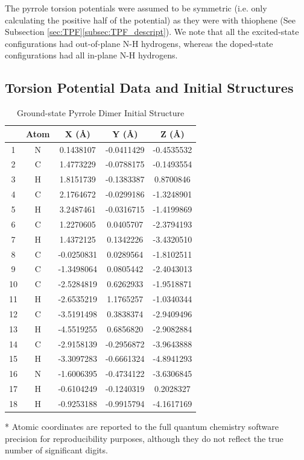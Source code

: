 The pyrrole torsion potentials were assumed to be symmetric (i.e. only calculating the positive half of the potential) as they were with thiophene (See Subsection \ref{sec:TPF}\ref{subsec:TPF_descript}). We note that all the excited-state configurations had out-of-plane N-H hydrogens, whereas the doped-state configurations had all in-plane N-H hydrogens.

\clearpage

\subsection{Torsion Potential Data and Initial Structures}
\begin{table}[hbt!]\centering
\caption{Ground-state Pyrrole Dimer Initial Structure}
\renewcommand{\arraystretch}{1.5}
\begin{threeparttable}
\begin{tabular}{ccccc}\toprule
{} & {Atom} & {X (\AA)} & {Y (\AA)} & {Z (\AA)} \\ \midrule
    1  & N &  0.1438107 & -0.0411429 & -0.4535532\\
    2  & C &  1.4773229 & -0.0788175 & -0.1493554\\
    3  & H &  1.8151739 & -0.1383387 &  0.8700846\\
    4  & C &  2.1764672 & -0.0299186 & -1.3248901\\
    5  & H &  3.2487461 & -0.0316715 & -1.4199869\\
    6  & C &  1.2270605 &  0.0405707 & -2.3794193\\
    7  & H &  1.4372125 &  0.1342226 & -3.4320510\\
    8  & C & -0.0250831 &  0.0289564 & -1.8102511\\
    9  & C & -1.3498064 &  0.0805442 & -2.4043013\\
    10 & C & -2.5284819 &  0.6262933 & -1.9518871\\
    11 & H & -2.6535219 &  1.1765257 & -1.0340344\\
    12 & C & -3.5191498 &  0.3838374 & -2.9409496\\
    13 & H & -4.5519255 &  0.6856820 & -2.9082884\\
    14 & C & -2.9158139 & -0.2956872 & -3.9643888\\
    15 & H & -3.3097283 & -0.6661324 & -4.8941293\\
    16 & N & -1.6006395 & -0.4734122 & -3.6306845\\
    17 & H & -0.6104249 & -0.1240319 &  0.2028327\\
    18 & H & -0.9253188 & -0.9915794 & -4.1617169\\ \bottomrule
\end{tabular}
\begin{tablenotes}
\item[*] \footnotesize Atomic coordinates are reported to the full quantum chemistry software precision for reproducibility purposes, although they do not reflect the true number of significant digits.
\end{tablenotes}
\end{threeparttable}
\end{table}

